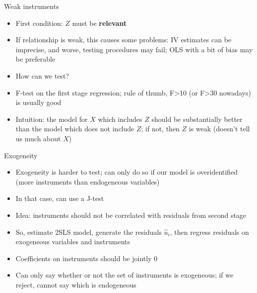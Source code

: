 \documentclass[aspectratio=169]{beamer}
\begin{document}
\begin{frame}{Weak instruments}
    \begin{itemize}
        \item First condition: $Z$ must be \textbf{relevant}
        \item If relationship is weak, this causes some problems: IV estimates can be imprecise, and worse, testing procedures may fail; OLS with a bit of bias may be preferable
        \item How can we test?
        \pause
        \item F-test on the first stage regression; rule of thumb, F>10 (or F>30 nowadays) is usually good
        \item Intuition: the model for $X$ which includes $Z$ should be substantially better than the model which does not include $Z$; if not, then $Z$ is weak (doesn't tell us much about $X$)
    \end{itemize}
\end{frame}

\begin{frame}{Exogeneity}
    \begin{itemize}
        \item Exogeneity is harder to test; can only do so if our model is overidentified (more instruments than endogeneous variables)
        \item In that case, can use a J-test 
        \item Idea: instruments should not be correlated with residuals from second stage
        \item So, estimate 2SLS model, generate the residuals $\hat{u}_i$, then regress residuals on exogeneous variables and instruments
        \item Coefficients on instruments should be jointly 0
        \item Can only say whether or not the set of instruments is exogeneous; if we reject, cannot say which is endogeneous
    \end{itemize}
\end{frame}
\end{document}
